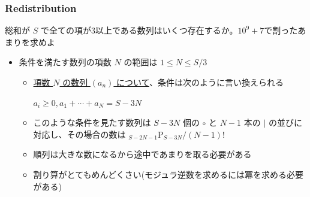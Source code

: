 \documentclass[t, aspectratio=169, dvipdfmx]{beamer}
\newcommand{\perm}[2]{{}_{#1}\mathrm{P}_{#2}}
\begin{document}
\begin{frame}
  \frametitle{Redistribution}
  総和が $S$ で全ての項が3以上である数列はいくつ存在するか。$10^9+7$で割ったあまりを求めよ
  \begin{itemize}
    \item 条件を満たす数列の項数 $N$ の範囲は $1 \leq N \leq S/3$
    \begin{itemize}
      \item \underline{項数 $N$ の数列 $(a_n)$ について}、条件は次のように言い換えられる
      \begin{tcolorbox}
        $a_i \geq 0, a_1+\cdots+a_N=S-3N$
      \end{tcolorbox}
      \item このような条件を見たす数列は $S-3N$ 個の $\circ$ と $N-1$ 本の $|$ の並びに対応し、その場合の数は $\perm{S-2N-1}{S-3N}/(N-1)!$
      \item 順列は大きな数になるから途中であまりを取る必要がある
      \item 割り算がとてもめんどくさい(モジュラ逆数を求めるには冪を求める必要がある)
    \end{itemize}
  \end{itemize}
\end{frame}
\end{document}
